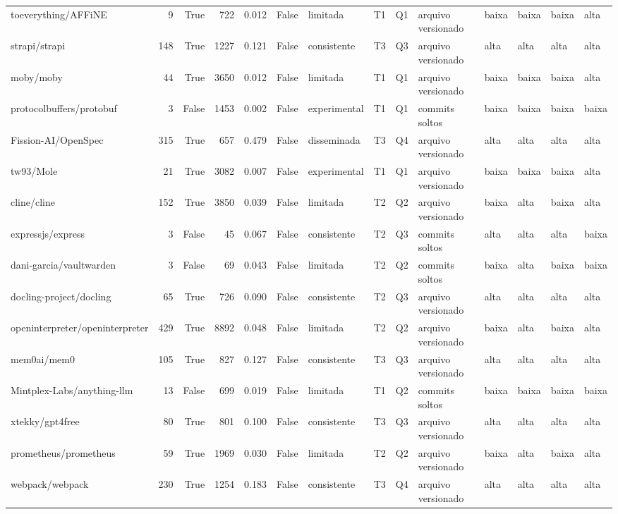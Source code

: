 \begin{tabular}{lrrrrrllllllll}
toeverything/AFFiNE & 9 & True & 722 & 0.012 & False & limitada & T1 & Q1 & arquivo versionado & baixa & baixa & baixa & alta \\
strapi/strapi & 148 & True & 1227 & 0.121 & False & consistente & T3 & Q3 & arquivo versionado & alta & alta & alta & alta \\
moby/moby & 44 & True & 3650 & 0.012 & False & limitada & T1 & Q1 & arquivo versionado & baixa & baixa & baixa & alta \\
protocolbuffers/protobuf & 3 & False & 1453 & 0.002 & False & experimental & T1 & Q1 & commits soltos & baixa & baixa & baixa & baixa \\
Fission-AI/OpenSpec & 315 & True & 657 & 0.479 & False & disseminada & T3 & Q4 & arquivo versionado & alta & alta & alta & alta \\
tw93/Mole & 21 & True & 3082 & 0.007 & False & experimental & T1 & Q1 & arquivo versionado & baixa & baixa & baixa & alta \\
cline/cline & 152 & True & 3850 & 0.039 & False & limitada & T2 & Q2 & arquivo versionado & baixa & alta & baixa & alta \\
expressjs/express & 3 & False & 45 & 0.067 & False & consistente & T2 & Q3 & commits soltos & alta & alta & alta & baixa \\
dani-garcia/vaultwarden & 3 & False & 69 & 0.043 & False & limitada & T2 & Q2 & commits soltos & baixa & alta & baixa & baixa \\
docling-project/docling & 65 & True & 726 & 0.090 & False & consistente & T2 & Q3 & arquivo versionado & alta & alta & alta & alta \\
openinterpreter/openinterpreter & 429 & True & 8892 & 0.048 & False & limitada & T2 & Q2 & arquivo versionado & baixa & alta & baixa & alta \\
mem0ai/mem0 & 105 & True & 827 & 0.127 & False & consistente & T3 & Q3 & arquivo versionado & alta & alta & alta & alta \\
Mintplex-Labs/anything-llm & 13 & False & 699 & 0.019 & False & limitada & T1 & Q2 & commits soltos & baixa & baixa & baixa & baixa \\
xtekky/gpt4free & 80 & True & 801 & 0.100 & False & consistente & T3 & Q3 & arquivo versionado & alta & alta & alta & alta \\
prometheus/prometheus & 59 & True & 1969 & 0.030 & False & limitada & T2 & Q2 & arquivo versionado & baixa & alta & baixa & alta \\
webpack/webpack & 230 & True & 1254 & 0.183 & False & consistente & T3 & Q4 & arquivo versionado & alta & alta & alta & alta \\

\end{tabular}
